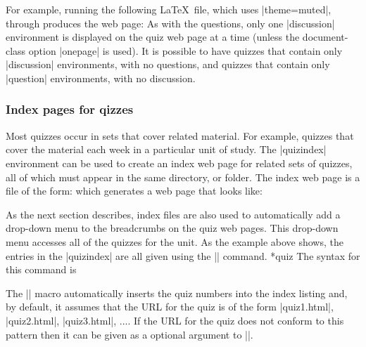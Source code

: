 \documentclass[svgnames]{article}
\begin{document}
  For example, running the following \LaTeX\ file, which uses
  \LatexCode|theme=muted|, through \WebQuiz
  produces the web page:
   As with the questions, only one
  \LatexCode|discussion| environment is displayed on the quiz web page
  at a time (unless the document-class option \LatexCode|onepage| is
  used). It is possible to have quizzes that contain only
  \LatexCode|discussion| environments, with no questions, and quizzes
  that contain only \LatexCode|question| environments, with no
  discussion.

  \subsubsection{Index pages for qizzes}\label{SS:index}


    Most quizzes occur in sets that cover related material. For example,
    quizzes that cover the material each week in a particular unit of
    study. The \LatexCode|quizindex| environment can be used to create an
    index web page for related sets of quizzes, all of which must appear in the same
    directory, or folder. The index web page is a \WebQuiz file of the
    form:
    which generates a web page that looks like:

    As the next section describes, index files are also used to
    automatically add a drop-down menu to the breadcrumbs on the quiz web
    pages. This drop-down menu accesses all of the quizzes for the unit.
    As the example above shows, the entries in the \LatexCode|quizindex| are all
    given using the \LatexCode|\quiz| command.
    *{quiz}
    The syntax for this command is

    \begin{latexcode}
    \end{latexcode}

    \noindent The \LatexCode|\quiz| macro automatically inserts the quiz
    numbers into the index listing and, by default, it assumes that the
    URL for the quiz is of the form \BashCode|quiz1.html|,
    \BashCode|quiz2.html|, \BashCode|quiz3.html|, .... If the URL for the quiz
    does not conform to this pattern then it can be given as a optional
    argument to \LatexCode|\quiz|.
\end{document}
